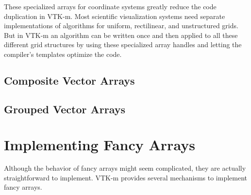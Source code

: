 

\begin{didyouknow}
  These specialized arrays for coordinate systems greatly reduce the code
  duplication in VTK-m. Most scientific visualization systems need separate
  implementations of algorithms for uniform, rectilinear, and unstructured
  grids. But in VTK-m an algorithm can be written once and then applied to
  all these different grid structures by using these specialized array
  handles and letting the compiler's templates optimize the code.
\end{didyouknow}

\subsection{Composite Vector Arrays}
\label{sec:CompositeVectorArrays}




\subsection{Grouped Vector Arrays}
\label{sec:GroupedVectorArrays}





\section{Implementing Fancy Arrays}
\label{sec:ImplementingFancyArrays}

Although the behavior of fancy arrays might seem complicated, they are
actually straightforward to implement. VTK-m provides several mechanisms to
implement fancy arrays.

